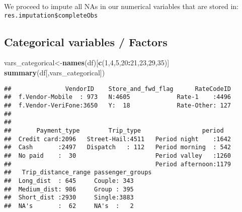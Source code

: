 \documentclass[
  18pt,
  a4paper]{article}
\newenvironment{Shaded}{\begin{snugshade}}{\end{snugshade}}
\newcommand{\CommentTok}[1]{\textcolor[rgb]{0.56,0.35,0.01}{\textit{#1}}}
\newcommand{\DataTypeTok}[1]{\textcolor[rgb]{0.13,0.29,0.53}{#1}}
\newcommand{\DecValTok}[1]{\textcolor[rgb]{0.00,0.00,0.81}{#1}}
\newcommand{\KeywordTok}[1]{\textcolor[rgb]{0.13,0.29,0.53}{\textbf{#1}}}
\newcommand{\NormalTok}[1]{#1}
\newcommand{\OperatorTok}[1]{\textcolor[rgb]{0.81,0.36,0.00}{\textbf{#1}}}
\newcommand{\StringTok}[1]{\textcolor[rgb]{0.31,0.60,0.02}{#1}}
\begin{document}
We proceed to impute all NAs in our numerical variables that are stored
in: \texttt{res.imputation\$completeObs}

\begin{Shaded}
\end{Shaded}

\hypertarget{categorical-variables-factors}{%
\subsection{Categorical variables /
Factors}\label{categorical-variables-factors}}

\begin{Shaded}
\begin{Highlighting}[]
\NormalTok{ vars_categorical<-}\KeywordTok{names}\NormalTok{(df)[}\KeywordTok{c}\NormalTok{(}\DecValTok{1}\NormalTok{,}\DecValTok{4}\NormalTok{,}\DecValTok{5}\NormalTok{,}\DecValTok{20}\OperatorTok{:}\DecValTok{21}\NormalTok{,}\DecValTok{23}\NormalTok{,}\DecValTok{29}\NormalTok{,}\DecValTok{35}\NormalTok{)]}
 \KeywordTok{summary}\NormalTok{(df[,vars_categorical])}
\end{Highlighting}
\end{Shaded}

\begin{verbatim}
##               VendorID    Store_and_fwd_flag      RateCodeID  
##  f.Vendor-Mobile  : 973   N:4605             Rate-1    :4496  
##  f.Vendor-VeriFone:3650   Y:  18             Rate-Other: 127  
##                                                               
##                                                               
##       Payment_type        Trip_type                 period    
##  Credit card:2096   Street-Hail:4511   Period night    :1642  
##  Cash       :2497   Dispatch   : 112   Period morning  : 542  
##  No paid    :  30                      Period valley   :1260  
##                                        Period afternoon:1179  
##   Trip_distance_range passenger_groups
##  Long_dist  : 645     Couple: 343     
##  Medium_dist: 986     Group : 395     
##  Short_dist :2930     Single:3883     
##  NA's       :  62     NA's  :   2
\end{verbatim}

\begin{Shaded}
\end{Shaded}
\end{document}
